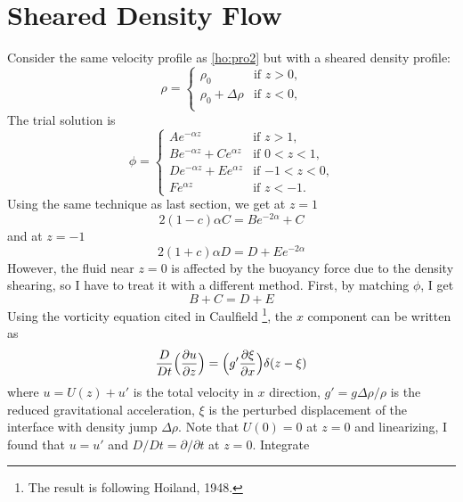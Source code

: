 \section{Sheared Density Flow}
Consider the same velocity profile as  \eqref{ho:pro2} but with a
sheared density profile:
\begin{equation}\label{she1}
\rho =
\begin{cases}
\rho_0 &\text{if $z>0$,}\\
\rho_0+\Delta\rho &\text{if $z<0$,}\\
\end{cases}
\end{equation}
The trial solution is
\begin{equation}\label{she2}
\phi =
\begin{cases}
Ae^{-\alpha z} &\text{if $z>1$,}\\
Be^{-\alpha z} + Ce^{\alpha z} &\text{if $0<z<1$,}\\
De^{-\alpha z} + Ee^{\alpha z} &\text{if $-1<z<0$,}\\
Fe^{\alpha z} &\text{if $z<-1$.}
\end{cases}
\end{equation}
Using the same technique as last section, we get at $z=1$
\begin{equation}\label{she3}
    2(1-c)\alpha C=Be^{-2\alpha}+C
\end{equation}
and at $z=-1$
\begin{equation}\label{she4}
    2(1+c)\alpha D=D+Ee^{-2\alpha}
\end{equation}
However, the fluid near $z=0$ is affected by the buoyancy force due
to the density shearing, so I have to treat it with a different
method. First, by matching $\phi$, I get
\begin{equation}\label{she5}
    B+C=D+E
\end{equation}
Using the vorticity equation cited in Caulfield
\cite{Caulfield}\footnote{The result is following Hoiland, 1948.},
the $x$ component can be written as
\begin{equation}\label{she6}
    \frac{D}{Dt}\Bigl(\frac{\partial u}{\partial z}\Bigr)=
    \Bigl(g'\frac{\partial \xi}{\partial x}\Bigr)\delta(z-\xi)
\end{equation}
where $u=U(z)+u'$ is the total velocity in $x$ direction,
$g'=g\Delta\rho/\rho$ is the reduced gravitational acceleration,
$\xi$ is the perturbed displacement of the interface with density
jump $\Delta\rho$. Note that $U(0)=0$ at $z=0$ and linearizing, I
found that $u=u'$ and $D/Dt=\partial/\partial t$ at $z=0$. Integrate
